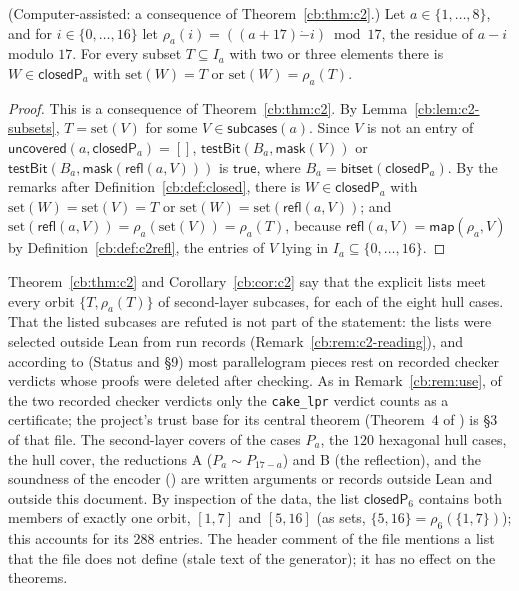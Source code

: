 \begin{corollary}\label{cb:cor:c2}
(Computer-assisted: a consequence of Theorem~\ref{cb:thm:c2}.) Let $a\in\{1,\dots,8\}$, and for $i\in\{0,\dots,16\}$
let $\rho_a(i)=((a+17)\mathbin{\dot-}i)\bmod17$, the residue of $a-i$ modulo $17$. For every subset $T\subseteq I_a$
with two or three elements there is $W\in\mathsf{closedP}_a$ with $\mathrm{set}(W)=T$ or
$\mathrm{set}(W)=\rho_a(T)$.
\end{corollary}

\begin{proof}
This is a consequence of Theorem~\ref{cb:thm:c2}. By Lemma~\ref{cb:lem:c2-subsets}, $T=\mathrm{set}(V)$ for some
$V\in\mathsf{subcases}(a)$. Since $V$ is not an entry of $\mathsf{uncovered}(a,\mathsf{closedP}_a)=[]$,
$\mathsf{testBit}(B_a,\mathsf{mask}(V))$ or $\mathsf{testBit}(B_a,\mathsf{mask}(\mathsf{refl}(a,V)))$ is
$\mathsf{true}$, where $B_a=\mathsf{bitset}(\mathsf{closedP}_a)$. By the remarks after Definition~\ref{cb:def:closed},
there is $W\in\mathsf{closedP}_a$ with $\mathrm{set}(W)=\mathrm{set}(V)=T$ or
$\mathrm{set}(W)=\mathrm{set}(\mathsf{refl}(a,V))$; and $\mathrm{set}(\mathsf{refl}(a,V))=\rho_a(\mathrm{set}(V))=
\rho_a(T)$, because $\mathsf{refl}(a,V)=\mathsf{map}(\rho_a,V)$ by Definition~\ref{cb:def:c2refl}, the entries of $V$
lying in $I_a\subseteq\{0,\dots,16\}$.
\end{proof}

\begin{remark}\label{cb:rem:c2-scope}
Theorem~\ref{cb:thm:c2} and Corollary~\ref{cb:cor:c2} say that the explicit lists meet every orbit $\{T,\rho_a(T)\}$ of
second-layer subcases, for each of the eight hull cases. That the listed subcases are refuted is not part of the
statement: the lists were selected outside Lean from run records (Remark~\ref{cb:rem:c2-reading}), and according to
 (Status and \S9) most parallelogram pieces rest on recorded checker verdicts whose proofs
were deleted after checking. As in Remark~\ref{cb:rem:use}, of the two recorded checker verdicts only the
\texttt{cake\_lpr} verdict counts as a certificate; the project's trust base for its central theorem (Theorem~4 of
) is \S3 of that file. The second-layer covers of the cases $P_a$, the $120$ hexagonal hull cases, the hull
cover, the reductions A ($P_a\sim P_{17-a}$) and B (the reflection), and the soundness of the encoder ()
are written arguments or records outside Lean and outside this document. By inspection of the data, the list
$\mathsf{closedP}_6$ contains both members of exactly one orbit, $[1,7]$ and $[5,16]$ (as sets,
$\{5,16\}=\rho_6(\{1,7\})$); this accounts for its $288$ entries. The header comment
of the file mentions a list  that the file does not define (stale text of the generator); it has
no effect on the theorems.
\end{remark}

